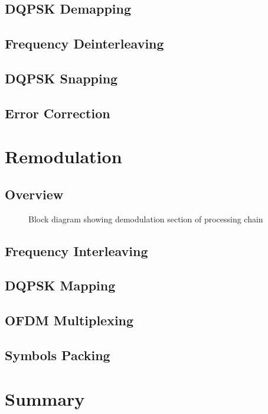 \documentclass[class=report,11pt,crop=false]{standalone}
\begin{document}
\subsection{DQPSK Demapping \label{subsect:dab-proc_dqpsk-demap}}
\subsection{Frequency Deinterleaving \label{subsect:dab-proc_freq-deinterleave}}
\subsection{DQPSK Snapping \label{subsect:dab-proc_dqpsk-snap}}
\subsection{Error Correction \label{subsect:dab-proc_error-correct}}

\section{Remodulation \label{sect:dab-proc_remodulate}}

\subsection{Overview}

\begin{figure}[htbp]
    \centering
    \captionsetup{type=figure}
    \def\svgwidth{\linewidth}
    { %
        }
    \caption{Block diagram showing demodulation section of processing chain}
    \label{fig:BD_Remod_All}
\end{figure}

\subsection{Frequency Interleaving \label{subsect:dab-proc_freq-interleave}}
\subsection{DQPSK Mapping \label{subsect:dab-proc_dqpsk-map}}
\subsection{OFDM Multiplexing \label{subsect:dab-proc_ofdm-mux}}
\subsection{Symbols Packing \label{subsect:dab-proc_symbols-pack}}

\section{Summary}

\ifstandalone

\printnoidxglossary[type=\acronymtype,nonumberlist]
\fi
\end{document}
